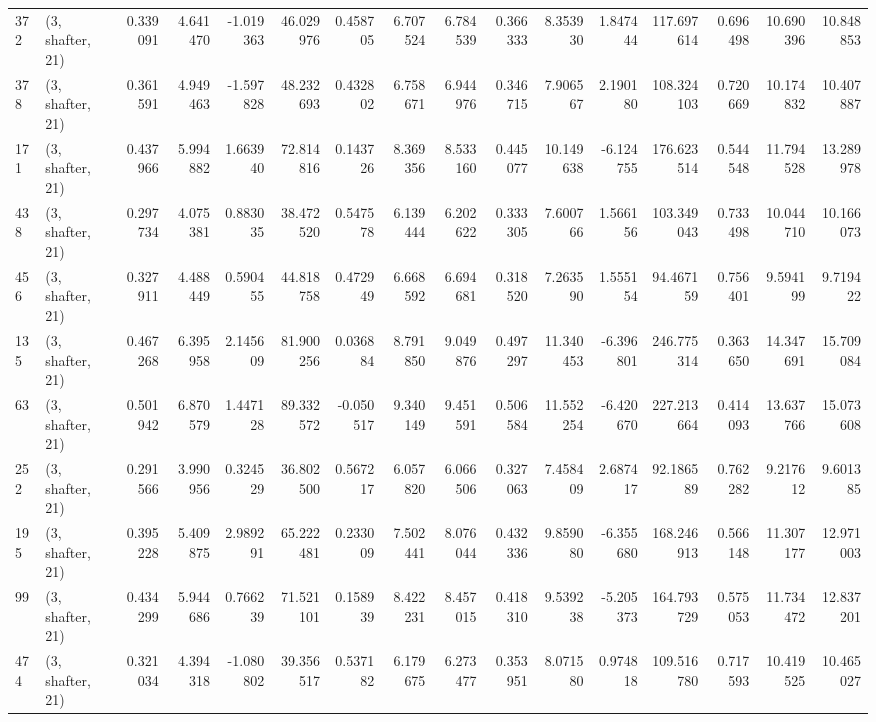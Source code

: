 \begin{tabular}{llrrrrrrrrrrrrrr}
372 &  (3, shafter, 21) &   0.339091 &   4.641470 &  -1.019363 &    46.029976 &   0.458705 &   6.707524 &   6.784539 &  0.366333 &   8.353930 &   1.847444 &   117.697614 &  0.696498 &  10.690396 &  10.848853 \\
378 &  (3, shafter, 21) &   0.361591 &   4.949463 &  -1.597828 &    48.232693 &   0.432802 &   6.758671 &   6.944976 &  0.346715 &   7.906567 &   2.190180 &   108.324103 &  0.720669 &  10.174832 &  10.407887 \\
171 &  (3, shafter, 21) &   0.437966 &   5.994882 &   1.663940 &    72.814816 &   0.143726 &   8.369356 &   8.533160 &  0.445077 &  10.149638 &  -6.124755 &   176.623514 &  0.544548 &  11.794528 &  13.289978 \\
438 &  (3, shafter, 21) &   0.297734 &   4.075381 &   0.883035 &    38.472520 &   0.547578 &   6.139444 &   6.202622 &  0.333305 &   7.600766 &   1.566156 &   103.349043 &  0.733498 &  10.044710 &  10.166073 \\
456 &  (3, shafter, 21) &   0.327911 &   4.488449 &   0.590455 &    44.818758 &   0.472949 &   6.668592 &   6.694681 &  0.318520 &   7.263590 &   1.555154 &    94.467159 &  0.756401 &   9.594199 &   9.719422 \\
135 &  (3, shafter, 21) &   0.467268 &   6.395958 &   2.145609 &    81.900256 &   0.036884 &   8.791850 &   9.049876 &  0.497297 &  11.340453 &  -6.396801 &   246.775314 &  0.363650 &  14.347691 &  15.709084 \\
63  &  (3, shafter, 21) &   0.501942 &   6.870579 &   1.447128 &    89.332572 &  -0.050517 &   9.340149 &   9.451591 &  0.506584 &  11.552254 &  -6.420670 &   227.213664 &  0.414093 &  13.637766 &  15.073608 \\
252 &  (3, shafter, 21) &   0.291566 &   3.990956 &   0.324529 &    36.802500 &   0.567217 &   6.057820 &   6.066506 &  0.327063 &   7.458409 &   2.687417 &    92.186589 &  0.762282 &   9.217612 &   9.601385 \\
195 &  (3, shafter, 21) &   0.395228 &   5.409875 &   2.989291 &    65.222481 &   0.233009 &   7.502441 &   8.076044 &  0.432336 &   9.859080 &  -6.355680 &   168.246913 &  0.566148 &  11.307177 &  12.971003 \\
99  &  (3, shafter, 21) &   0.434299 &   5.944686 &   0.766239 &    71.521101 &   0.158939 &   8.422231 &   8.457015 &  0.418310 &   9.539238 &  -5.205373 &   164.793729 &  0.575053 &  11.734472 &  12.837201 \\
474 &  (3, shafter, 21) &   0.321034 &   4.394318 &  -1.080802 &    39.356517 &   0.537182 &   6.179675 &   6.273477 &  0.353951 &   8.071580 &   0.974818 &   109.516780 &  0.717593 &  10.419525 &  10.465027 \\

\end{tabular}
